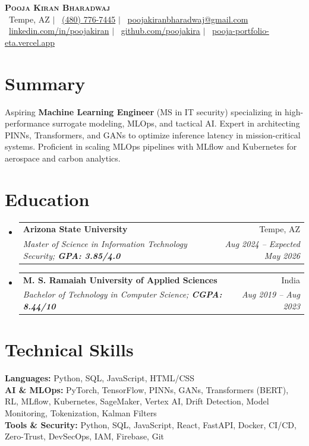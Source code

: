 \documentclass[letterpaper,10pt]{article}
\makeatletter
\newcommand{\resumeSubheading}[4]{
  \vspace{-3pt}\item
    \begin{tabular*}{0.97\textwidth}[t]{l@{\extracolsep{\fill}}r}
      \textbf{#1} & \small #2 \\
      \textit{\small#3} & \textit{\small #4} \\
    \end{tabular*}\vspace{-8pt}
}
\newcommand{\resumeSubHeadingListStart}{\begin{itemize}[leftmargin=0.12in, label={}]}
\newcommand{\resumeSubHeadingListEnd}{\end{itemize}}
\makeatother
\begin{document}
\begin{center}
    {\Huge \scshape \textbf{Pooja Kiran Bharadwaj}} \\ \vspace{4pt}
    \small
    \faMapMarker*\ Tempe, AZ \quad $|$ \quad
    \faPhone\ \href{tel:+14807767445}{(480) 776-7445} \quad $|$ \quad
    \faEnvelope\ \href{mailto:poojakiranbharadwaj@gmail.com}{poojakiranbharadwaj@gmail.com} \\[2pt]
    \faLinkedin\ \href{https://linkedin.com/in/poojakiran/}{linkedin.com/in/poojakiran} \quad $|$ \quad
    \faGithub\ \href{https://github.com/poojakira}{github.com/poojakira} \quad $|$ \quad
    \faGlobe\ \href{https://pooja-portfolio-eta.vercel.app/}{pooja-portfolio-eta.vercel.app}
\end{center}

\section{Summary}
 \begin{itemize}[leftmargin=0.12in, label={}]
    \small{\item{
     Aspiring \textbf{Machine Learning Engineer} (MS in IT security) specializing in high-performance surrogate modeling, MLOps, and tactical AI. Expert in architecting PINNs, Transformers, and GANs to optimize inference latency in mission-critical systems. Proficient in scaling MLOps pipelines with MLflow and Kubernetes for aerospace and carbon analytics.
    }}
 \end{itemize}

\section{Education}
  \resumeSubHeadingListStart
    \resumeSubheading
      {Arizona State University}{Tempe, AZ}
      {Master of Science in Information Technology Security; \textbf{GPA: 3.85/4.0}}{Aug 2024 -- Expected May 2026}
    \resumeSubheading
      {M. S. Ramaiah University of Applied Sciences}{India}
      {Bachelor of Technology in Computer Science; \textbf{CGPA: 8.44/10}}{Aug 2019 -- Aug 2023}
  \resumeSubHeadingListEnd

\section{Technical Skills}
 \begin{itemize}[leftmargin=0.12in, label={}]
    \small{\item{
     \textbf{Languages:}{ Python, SQL, JavaScript, HTML/CSS} \\
     \textbf{AI \& MLOps:}{ PyTorch, TensorFlow, PINNs, GANs, Transformers (BERT), RL, MLflow, Kubernetes, SageMaker, Vertex AI, Drift Detection, Model Monitoring, Tokenization, Kalman Filters} \\
     \textbf{Tools \& Security:}{ Python, SQL, JavaScript, React, FastAPI, Docker, CI/CD, Zero-Trust, DevSecOps, IAM, Firebase, Git}
    }}
 \end{itemize}
\end{document}
